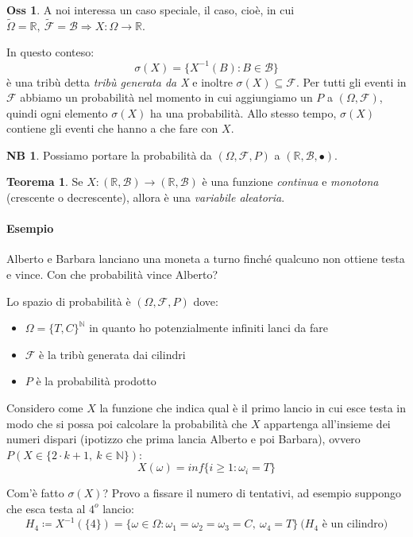 \documentclass[12pt, a4paper]{report}
\theoremstyle{definition}
\newtheorem{theorem}{Teorema}[section]
\newtheorem*{observation}{Oss}
\newtheorem*{note}{NB}
\DeclareRobustCommand{\F}{\mathcal{F}}%
\DeclareRobustCommand{\R}{\mathbb{R}}%
\DeclareRobustCommand{\N}{\mathbb{N}}%
\DeclareRobustCommand{\B}{\mathcal{B}}%
\DeclareRobustCommand{\probspace}{(\Omega,\F,P)}
\DeclareRobustCommand{\probzspace}{(\Omega,\F)}
\begin{document}
\newpage
\begin{observation}
	A noi interessa un caso speciale, il caso, cioè, in cui \(\tilde{\Omega}=\R,
	\ \tilde{\F}=\B\Rightarrow X:\Omega\rightarrow\R\).
\end{observation}

\noindent
In questo conteso:
\[\sigma(X)=\{X^{-1}(B): B\in\B\}\]
è una tribù detta \emph{tribù generata da X} e inoltre \(\sigma(X)\subseteq\F\).
Per tutti gli eventi in $\F$ abbiamo un probabilità nel momento in cui aggiungiamo
un $P$ a $\probzspace$, quindi ogni elemento \(\sigma(X)\) ha una probabilità.
Allo stesso tempo, $\sigma(X)$ contiene gli eventi che hanno a che fare con $X$.

\begin{note}
	Possiamo portare la probabilità da $\probspace$ a \((\R,\B,\bullet)\).
\end{note}

\begin{theorem}
	Se \(X:(\R,\B)\rightarrow(\R,\B)\) è una funzione \emph{continua} e 
	\emph{monotona} (crescente o decrescente), allora è una \emph{variabile aleatoria}.
\end{theorem}

\paragraph*{Esempio}
Alberto e Barbara lanciano una moneta a turno finché qualcuno non ottiene testa
e vince. Con che probabilità vince Alberto?

Lo spazio di probabilità è $\probspace$ dove:
\begin{itemize}
	\item \(\Omega=\{T,C\}^\N\) in quanto ho potenzialmente infiniti lanci da fare
	\item $\F$ è la tribù generata dai cilindri
	\item $P$ è la probabilità prodotto
\end{itemize}

Considero come $X$ la funzione che indica qual è il primo lancio in cui esce
testa in modo che si possa poi calcolare la probabilità che $X$ appartenga
all'insieme dei numeri dispari (ipotizzo che prima lancia Alberto e poi Barbara),
ovvero \(P(X\in\{2\cdot k+1,\ k\in\N\})\):
\[X(\omega)=inf\{i\geq 1:\omega_i=T\}\]

Com'è fatto \(\sigma(X)\)?
Provo a fissare il numero di tentativi, ad esempio suppongo che esca testa al
$4^o$ lancio:
\[H_4\coloneqq X^{-1}(\{4\})=\{\omega\in\Omega:\omega_1=\omega_2=\omega_3=C,\ 
\omega_4=T\}\ \text{($H_4$ è un cilindro)}\]
\end{document}
